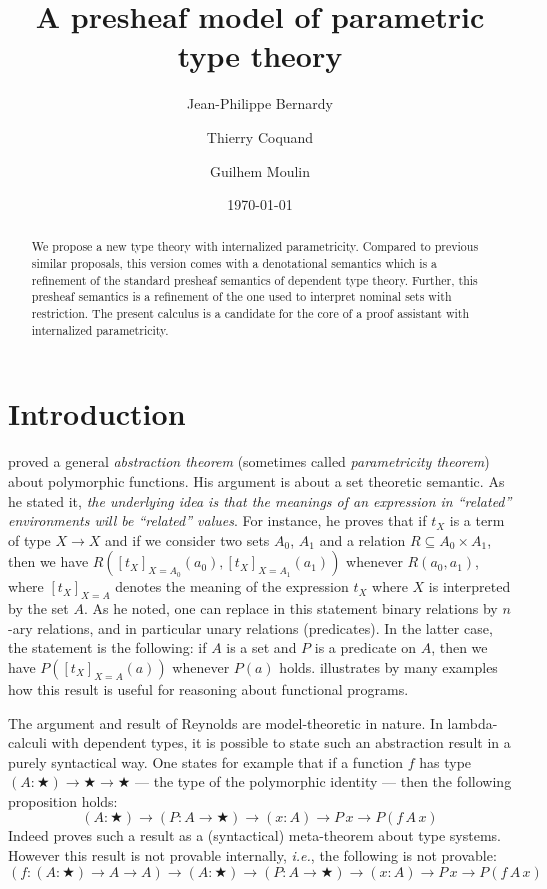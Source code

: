 \documentclass[english]{PaperTools/latex/lipics}
\title{A presheaf model of parametric type theory}
\author{Jean-Philippe Bernardy}
\author{Thierry Coquand}
\author{Guilhem Moulin}
\affil{Chalmers University of Technology and University of Gothenburg \\
\texttt{\{bernardy,coquand,mouling\}@chalmers.se}}
\date{\today}
\def\ie{\textit{i.e.}}
\begin{document}
\maketitle

\begin{abstract}
  We propose a new type theory with internalized
  parametricity. Compared to previous similar proposals, this version
  comes with a denotational semantics which is a refinement of the
  standard presheaf semantics of dependent type theory. Further, this
  presheaf semantics is a refinement of the one used to interpret
  nominal sets with restriction.  The present calculus is a candidate for the
  core of a proof assistant with internalized parametricity.
\end{abstract}

\section{Introduction}
\cite{reynolds_types_1983} proved a general \emph{abstraction theorem} (sometimes called
\emph{parametricity theorem}) about polymorphic functions. His argument is
about a set theoretic semantic.  As he stated it, {\em the underlying
  idea is that the meanings of an expression in ``related''
  environments will be ``related'' values}.  For instance, he proves
that if $t_X$ is a term of type $X → X$ and if we consider two sets
$A_0$, $A_1$ and a relation $R ⊆ A_0 × A_1$, then we have
$R([t_X]_{X=A_0}(a_0),[t_X]_{X=A_1}(a_1))$ whenever $R(a_0,a_1)$,
where $[t_X]_{X=A}$ denotes the meaning of the expression $t_X$ where
$X$ is interpreted by the set $A$. As he noted, one can replace in
this statement binary relations by $n$-ary relations, and in particular
unary relations (predicates). In the latter case, the statement is the following:
if $A$ is a set and $P$ is a predicate on $A$, then we have
$P([t_X]_{X=A}(a))$ whenever $P(a)$ holds.
\cite{wadler_theorems_1989} illustrates by many examples how this
result is useful for reasoning about functional programs.

The argument and result of Reynolds are model-theoretic in nature.
In lambda-calculi with dependent types, it is possible to state such an
abstraction result in a purely syntactical way.
One states for example that if a function $f$ has type
$(A : ★) → ★ → ★$ --- the type of the polymorphic identity --- then the
following proposition holds:
$$ (A : ★) → (P : A → ★) → (x : A) → P\, x → P (f\, A\, x) $$
%
Indeed \citet{bernardy_proofs_2012} proves such a result as a
(syntactical) meta-theorem about type systems. However this result is
not provable internally, \ie, the following is not provable:
$$ (f : (A:★) → A → A) →  (A : ★) → (P : A → ★) → (x : A) → P\, x → P (f\, A\, x) $$
\end{document}
